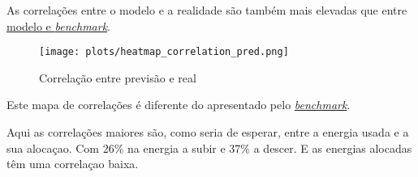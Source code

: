 As correlações entre o modelo e a realidade são também mais elevadas que entre \hyperref[fig:featurecorrelation]{modelo e \textit{benchmark}}.


\begin{figure}[H]
    \centering
    \texttt{[image: plots/heatmap\_correlation\_pred.png]}
    \caption{Correlação entre previsão e real}
    \label{fig:predcorrelation}
  \end{figure}

Este mapa de correlações é diferente do apresentado pelo \hyperref[fig:benchmarkcorr]{\textit{benchmark}}.\par
Aqui as correlações maiores são, como seria de esperar, entre a energia usada e a sua alocaçao. Com 26\% na energia a subir e 37\% a descer. E as energias alocadas têm uma correlaçao baixa.\par 